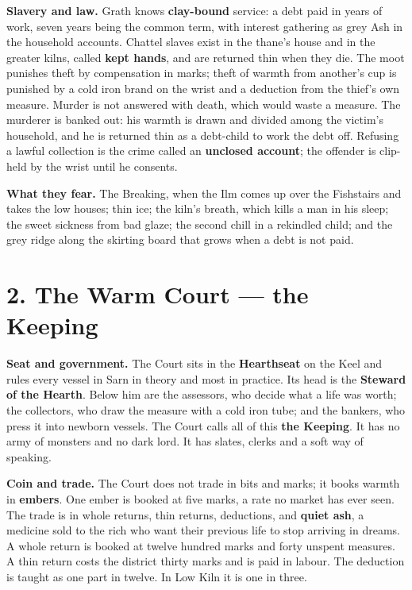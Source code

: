 \documentclass{design/chronicle}
\begin{document}
\textbf{Slavery and law.} Grath knows \textbf{clay-bound} service: a debt paid in years of work, seven years being the common term, with interest gathering as grey Ash in the household accounts. Chattel slaves exist in the thane’s house and in the greater kilns, called \textbf{kept hands}, and are returned thin when they die. The moot punishes theft by compensation in marks; theft of warmth from another’s cup is punished by a cold iron brand on the wrist and a deduction from the thief’s own measure. Murder is not answered with death, which would waste a measure. The murderer is banked out: his warmth is drawn and divided among the victim’s household, and he is returned thin as a debt-child to work the debt off. Refusing a lawful collection is the crime called an \textbf{unclosed account}; the offender is clip-held by the wrist until he consents.

\textbf{What they fear.} The Breaking, when the Ilm comes up over the Fishstairs and takes the low houses; thin ice; the kiln’s breath, which kills a man in his sleep; the sweet sickness from bad glaze; the second chill in a rekindled child; and the grey ridge along the skirting board that grows when a debt is not paid.

\section*{2. The Warm Court — the Keeping}

\textbf{Seat and government.} The Court sits in the \textbf{Hearthseat} on the Keel and rules every vessel in Sarn in theory and most in practice. Its head is the \textbf{Steward of the Hearth}. Below him are the assessors, who decide what a life was worth; the collectors, who draw the measure with a cold iron tube; and the bankers, who press it into newborn vessels. The Court calls all of this \textbf{the Keeping}. It has no army of monsters and no dark lord. It has slates, clerks and a soft way of speaking.

\textbf{Coin and trade.} The Court does not trade in bits and marks; it books warmth in \textbf{embers}. One ember is booked at five marks, a rate no market has ever seen. The trade is in whole returns, thin returns, deductions, and \textbf{quiet ash}, a medicine sold to the rich who want their previous life to stop arriving in dreams. A whole return is booked at twelve hundred marks and forty unspent measures. A thin return costs the district thirty marks and is paid in labour. The deduction is taught as one part in twelve. In Low Kiln it is one in three.
\end{document}
